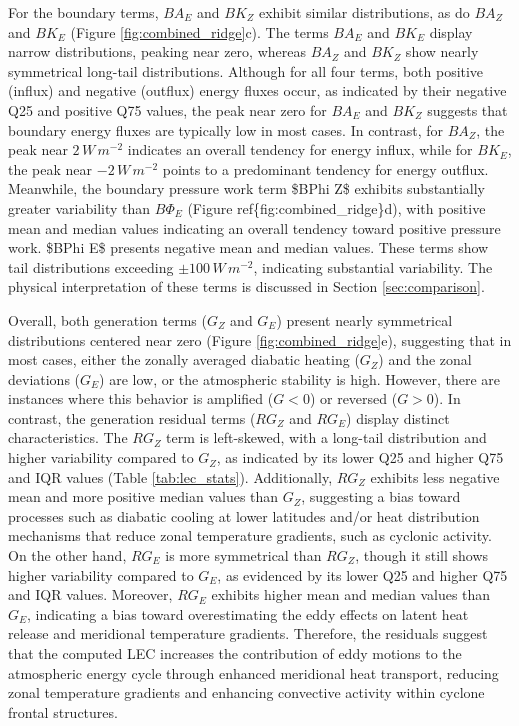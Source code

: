 \documentclass[pdflatex,sn-chicago]{sn-jnl}%
\theoremstyle{plain}
\theoremstyle{definition}
\theoremstyle{remark}
\theoremstyle{definition}
\begin{document}
For the boundary terms, $BA_E$ and $BK_Z$ exhibit similar distributions, as do $BA_Z$ and $BK_E$ (Figure \ref{fig:combined_ridge}c). The terms $BA_E$ and $BK_E$ display narrow distributions, peaking near zero, whereas $BA_Z$ and $BK_Z$ show nearly symmetrical long-tail distributions. Although for all four terms, both positive (influx) and negative (outflux) energy fluxes occur, as indicated by their negative Q25 and positive Q75 values, the peak near zero for $BA_E$ and $BK_Z$ suggests that boundary energy fluxes are typically low in most cases. In contrast, for $BA_Z$, the peak near $2 \, W \, m^{-2}$ indicates an overall tendency for energy influx, while for $BK_E$, the peak near $-2 \, W \, m^{-2}$ points to a predominant tendency for energy outflux. Meanwhile, the boundary pressure work term \$BPhi Z\$ exhibits substantially greater variability than $B\Phi_E$ (Figure ref\{fig:combined\_ridge\}d), with positive mean and median values indicating an overall tendency toward positive pressure work. \$BPhi E\$ presents negative mean and median values. These terms show tail distributions exceeding $\pm 100 \, W \, m^{-2}$, indicating substantial variability. The physical interpretation of these terms is discussed in Section \ref{sec:comparison}.

Overall, both generation terms ($G_Z$ and $G_E$) present nearly symmetrical distributions centered near zero (Figure \ref{fig:combined_ridge}e), suggesting that in most cases, either the zonally averaged diabatic heating ($G_Z$) and the zonal deviations ($G_E$) are low, or the atmospheric stability is high. However, there are instances where this behavior is amplified ($G < 0$) or reversed ($G > 0$). In contrast, the generation residual terms ($RG_Z$ and $RG_E$) display distinct characteristics. The $RG_Z$ term is left-skewed, with a long-tail distribution and higher variability compared to $G_Z$, as indicated by its lower Q25 and higher Q75 and IQR values (Table \ref{tab:lec_stats}). Additionally, $RG_Z$ exhibits less negative mean and more positive median values than $G_Z$, suggesting a bias toward processes such as diabatic cooling at lower latitudes and/or heat distribution mechanisms that reduce zonal temperature gradients, such as cyclonic activity. On the other hand, $RG_E$ is more symmetrical than $RG_Z$, though it still shows higher variability compared to $G_E$, as evidenced by its lower Q25 and higher Q75 and IQR values. Moreover, $RG_E$ exhibits higher mean and median values than $G_E$, indicating a bias toward overestimating the eddy effects on latent heat release and meridional temperature gradients. Therefore, the residuals suggest that the computed LEC increases the contribution of eddy motions to the atmospheric energy cycle through enhanced meridional heat transport, reducing zonal temperature gradients and enhancing convective activity within cyclone frontal structures.
\end{document}

